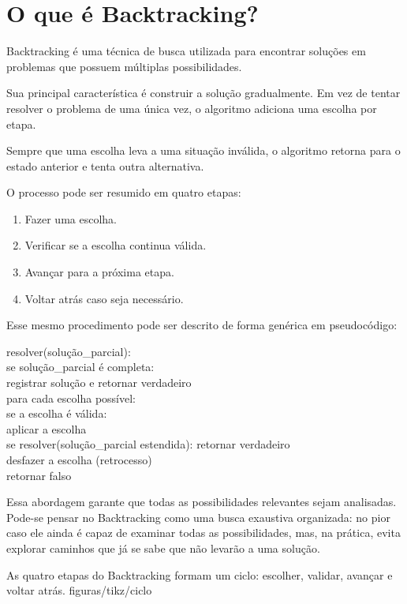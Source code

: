 \section{O que é Backtracking?}

Backtracking é uma técnica de busca utilizada para encontrar soluções em problemas que possuem múltiplas possibilidades.

Sua principal característica é construir a solução gradualmente. Em vez de tentar resolver o problema de uma única vez, o algoritmo adiciona uma escolha por etapa.

Sempre que uma escolha leva a uma situação inválida, o algoritmo retorna para o estado anterior e tenta outra alternativa.

O processo pode ser resumido em quatro etapas:

\begin{passos}
\begin{enumerate}[leftmargin=1.4em]
  \item Fazer uma escolha.
  \item Verificar se a escolha continua válida.
  \item Avançar para a próxima etapa.
  \item Voltar atrás caso seja necessário.
\end{enumerate}
\end{passos}

Esse mesmo procedimento pode ser descrito de forma genérica em pseudocódigo:

\begin{pseudocodigo}
resolver(solução\_parcial):\\
\quad se solução\_parcial é completa:\\
\quad\quad registrar solução e retornar verdadeiro\\
\quad para cada escolha possível:\\
\quad\quad se a escolha é válida:\\
\quad\quad\quad aplicar a escolha\\
\quad\quad\quad se resolver(solução\_parcial estendida): retornar verdadeiro\\
\quad\quad\quad desfazer a escolha \textcolor{btPodado}{(retrocesso)}\\
\quad retornar falso
\end{pseudocodigo}

Essa abordagem garante que todas as possibilidades relevantes sejam analisadas. Pode-se pensar no Backtracking como uma busca exaustiva organizada: no pior caso ele ainda é capaz de examinar todas as possibilidades, mas, na prática, evita explorar caminhos que já se sabe que não levarão a uma solução.

%
  {As quatro etapas do Backtracking formam um ciclo: escolher, validar, avançar e voltar atrás.}%
  {figuras/tikz/ciclo}
